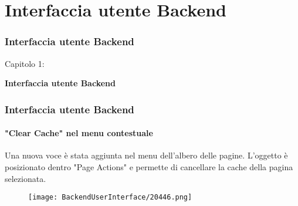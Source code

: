 %

\section{Interfaccia utente Backend}
\begin{frame}[fragile]
	\frametitle{Interfaccia utente Backend}

	\begin{center}\huge{Capitolo 1:}\end{center}
	\begin{center}\huge{\color{typo3darkgrey}\textbf{Interfaccia utente Backend}}\end{center}

\end{frame}

\begin{frame}[fragile]
	\frametitle{Interfaccia utente Backend}
	\framesubtitle{"Clear Cache" nel menu contestuale}

	Una nuova voce è stata aggiunta nel menu dell'albero delle pagine. L'oggetto è posizionato dentro "Page Actions"
	e permette di cancellare la cache della pagina selezionata.

	\begin{figure}
		\texttt{[image: BackendUserInterface/20446.png]}
	\end{figure}

\end{frame}

